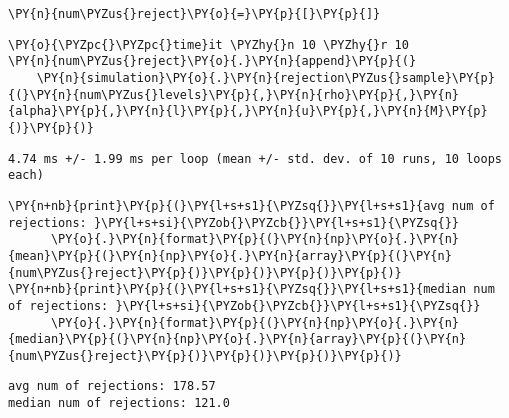 \documentclass[10pt, article,table]{article}
\begin{document}
\begin{tcolorbox}[breakable, size=fbox, boxrule=1pt, pad at break*=1mm,colback=cellbackground, colframe=cellborder]
\begin{Verbatim}[commandchars=\\\{\}]
\PY{n}{num\PYZus{}reject}\PY{o}{=}\PY{p}{[}\PY{p}{]}
\end{Verbatim}
\end{tcolorbox}

\begin{tcolorbox}[breakable, size=fbox, boxrule=1pt, pad at break*=1mm,colback=cellbackground, colframe=cellborder]
\begin{Verbatim}[commandchars=\\\{\}]
\PY{o}{\PYZpc{}\PYZpc{}time}it \PYZhy{}n 10 \PYZhy{}r 10
\PY{n}{num\PYZus{}reject}\PY{o}{.}\PY{n}{append}\PY{p}{(}
    \PY{n}{simulation}\PY{o}{.}\PY{n}{rejection\PYZus{}sample}\PY{p}{(}\PY{n}{num\PYZus{}levels}\PY{p}{,}\PY{n}{rho}\PY{p}{,}\PY{n}{alpha}\PY{p}{,}\PY{n}{l}\PY{p}{,}\PY{n}{u}\PY{p}{,}\PY{n}{M}\PY{p}{)}\PY{p}{)}
\end{Verbatim}
\end{tcolorbox}
\begin{tcolorbox}[breakable, size=fbox, boxrule=.5pt, pad at break*=1mm, opacityfill=0]
\texttt{4.74 ms +/- 1.99 ms per loop (mean +/- std. dev. of 10 runs, 10 loops each)}
\end{tcolorbox}

\begin{tcolorbox}[breakable, size=fbox, boxrule=1pt, pad at break*=1mm,colback=cellbackground, colframe=cellborder]
\begin{Verbatim}[commandchars=\\\{\}]
\PY{n+nb}{print}\PY{p}{(}\PY{l+s+s1}{\PYZsq{}}\PY{l+s+s1}{avg num of rejections: }\PY{l+s+si}{\PYZob{}\PYZcb{}}\PY{l+s+s1}{\PYZsq{}}
      \PY{o}{.}\PY{n}{format}\PY{p}{(}\PY{n}{np}\PY{o}{.}\PY{n}{mean}\PY{p}{(}\PY{n}{np}\PY{o}{.}\PY{n}{array}\PY{p}{(}\PY{n}{num\PYZus{}reject}\PY{p}{)}\PY{p}{)}\PY{p}{)}\PY{p}{)}
\PY{n+nb}{print}\PY{p}{(}\PY{l+s+s1}{\PYZsq{}}\PY{l+s+s1}{median num of rejections: }\PY{l+s+si}{\PYZob{}\PYZcb{}}\PY{l+s+s1}{\PYZsq{}}
      \PY{o}{.}\PY{n}{format}\PY{p}{(}\PY{n}{np}\PY{o}{.}\PY{n}{median}\PY{p}{(}\PY{n}{np}\PY{o}{.}\PY{n}{array}\PY{p}{(}\PY{n}{num\PYZus{}reject}\PY{p}{)}\PY{p}{)}\PY{p}{)}\PY{p}{)}
\end{Verbatim}
\end{tcolorbox}
\begin{tcolorbox}[breakable, size=fbox, boxrule=.5pt, pad at break*=1mm, opacityfill=0]
    \begin{Verbatim}[commandchars=\\\{\}]
avg num of rejections: 178.57
median num of rejections: 121.0
    \end{Verbatim}
\end{tcolorbox}
\end{document}
